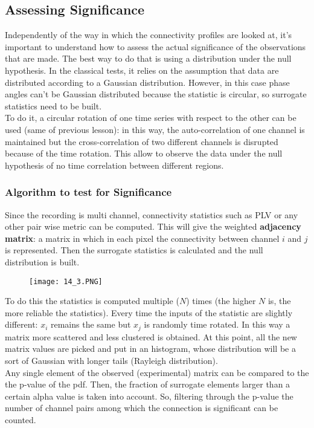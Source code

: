 \subsection{Assessing Significance}
Independently of the way in which the connectivity profiles are looked at, it's important to understand how to assess the actual significance of the observations that are made.
The best way to do that is using a distribution under the null hypothesis. In the classical tests, it relies on the assumption that data are distributed according to a Gaussian distribution. However, in this case phase angles can't be Gaussian distributed because the statistic is circular, so surrogate statistics need to be built.\\
To do it, a circular rotation of one time series with respect to the other can be used (same of previous lesson): in this way, the auto-correlation of one channel is maintained but the cross-correlation of two different channels is disrupted because of the time rotation. This allow to observe the data under the null hypothesis of no time correlation between different regions.
\subsubsection{Algorithm to test for Significance}
Since the recording is multi channel, connectivity statistics such as PLV or any other pair wise metric can be computed. This will give the weighted \textbf{adjacency matrix}: a matrix in which in each pixel the connectivity between channel \(i\) and \(j\) is represented.
Then the surrogate statistics is calculated and the null distribution is built.
\begin{figure}[H]
    \centering
    \texttt{[image: 14\_3.PNG]}
\end{figure}
To do this the statistics is computed multiple (\(N\)) times (the higher \(N\) is, the more reliable the statistics). Every time the inputs of the statistic are slightly different: \(x_i\) remains the same but \(x_j\) is randomly time rotated. In this way a matrix more scattered and less clustered is obtained. At this point, all the new matrix values are picked and put in an histogram, whose distribution will be a sort of Gaussian with longer tails (Rayleigh distribution).\\
Any single element of the observed (experimental) matrix can be compared to the the p-value of the pdf. Then, the fraction of surrogate elements larger than a certain alpha value is taken into account. So, filtering through the p-value the number of channel pairs among which the connection is significant can be counted.
